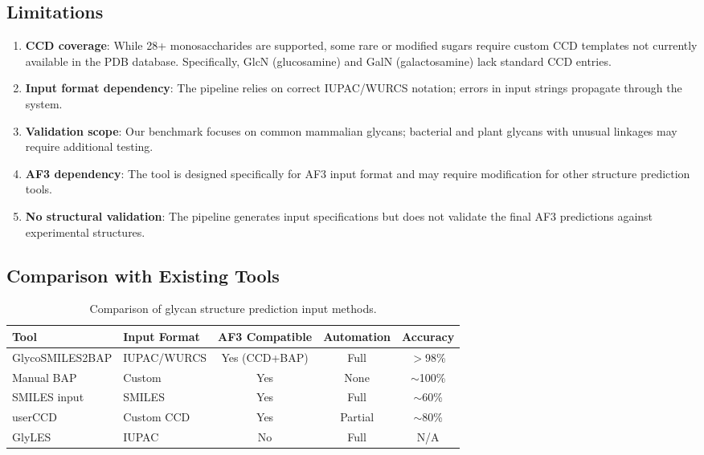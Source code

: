 \subsection{Limitations}

\begin{enumerate}
\item \textbf{CCD coverage}: While 28+ monosaccharides are supported, some rare or modified sugars require custom CCD templates not currently available in the PDB database. Specifically, GlcN (glucosamine) and GalN (galactosamine) lack standard CCD entries.

\item \textbf{Input format dependency}: The pipeline relies on correct IUPAC/WURCS notation; errors in input strings propagate through the system.

\item \textbf{Validation scope}: Our benchmark focuses on common mammalian glycans; bacterial and plant glycans with unusual linkages may require additional testing.

\item \textbf{AF3 dependency}: The tool is designed specifically for AF3 input format and may require modification for other structure prediction tools.

\item \textbf{No structural validation}: The pipeline generates input specifications but does not validate the final AF3 predictions against experimental structures.
\end{enumerate}

\subsection{Comparison with Existing Tools}

\begin{table}[h]
\centering
\caption{Comparison of glycan structure prediction input methods.}
\label{tab:comparison}
\begin{tabular}{llccc}
\toprule
\textbf{Tool} & \textbf{Input Format} & \textbf{AF3 Compatible} & \textbf{Automation} & \textbf{Accuracy} \\
\midrule
GlycoSMILES2BAP & IUPAC/WURCS & Yes (CCD+BAP) & Full & $>$98\% \\
Manual BAP & Custom & Yes & None & $\sim$100\% \\
SMILES input & SMILES & Yes & Full & $\sim$60\% \\
userCCD & Custom CCD & Yes & Partial & $\sim$80\% \\
GlyLES & IUPAC & No & Full & N/A \\
\bottomrule
\end{tabular}
\end{table}

